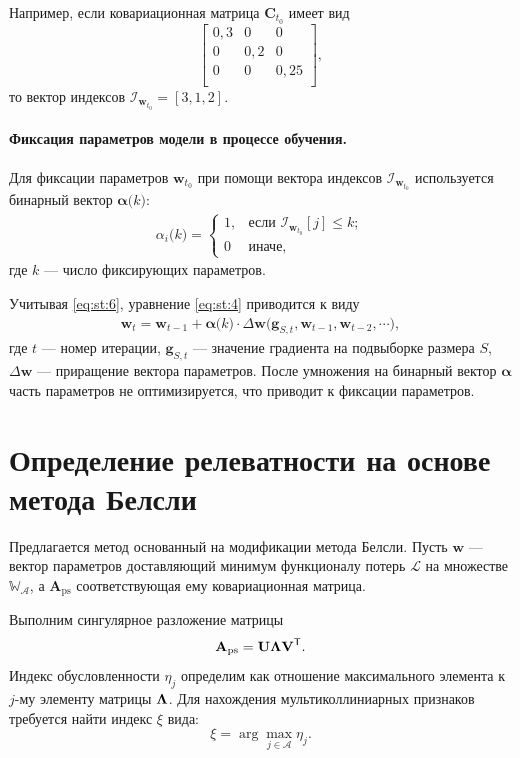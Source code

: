 Например, если ковариационная матрица $\textbf{C}_{t_0}$  имеет вид
 $$
\begin{bmatrix}
0{,}3& 0 & 0\\
0& 0{,}2 & 0\\
0& 0 & 0{,}25\\
\end{bmatrix},
 $$
 то вектор индексов $\mathcal{I}_{\textbf{w}_{t_0}} = [3,1,2]$.
 
\paragraph{Фиксация параметров модели в процессе обучения.}
Для фиксации параметров $\textbf{w}_{t_0}$ при помощи вектора индексов $\mathcal{I}_{\textbf{w}_{t_0}}$ используется бинарный вектор $\bm{\alpha}\bigr(k\bigr)$:
\[
\label{eq:st:6}
\begin{aligned}
\alpha_i\bigr(k\bigr) = \begin{cases}
   1, &\text{если }\mathcal{I}_{\textbf{w}_{t_0}}[j] \leq k;\\
   0 &\text{иначе},
 \end{cases}
\end{aligned}
\]
 где $k$ --- число фиксирующих параметров.
 
 Учитывая \eqref{eq:st:6}, уравнение \eqref{eq:st:4} приводится к виду
 \[
\label{eq:st:7}
\begin{aligned}
\textbf{w}_{t} = \textbf{w}_{t-1} + \bm{\alpha}\bigr(k\bigr)\cdot\Delta\textbf{w}\bigr(\textbf{g}_{S,t}, \textbf{w}_{t-1}, \textbf{w}_{t-2}, \cdots\bigr),
\end{aligned}
\]
где $t$ --- номер итерации, $\textbf{g}_{S,t}$ --- значение градиента на подвыборке размера $S$, $\Delta\textbf{w}$ --- приращение вектора параметров. После умножения на бинарный вектор $\bm\alpha$ часть параметров не оптимизируется, что приводит к фиксации параметров.

\section{Определение релеватности на основе метода Белсли}
Предлагается метод основанный на модификации метода Белсли. Пусть $\textbf{w}$ --- вектор параметров доставляющий минимум функционалу потерь $\mathcal{L}$ на  множестве $\mathbb{W_\mathcal{A}}$, а $\textbf{A}_\text{ps}$ соответствующая ему ковариационная матрица.

Выполним сингулярное разложение матрицы
\[
\label{4.1}
\textbf{A}_\text{ps} = \textbf{U}{\bf\Lambda}\textbf{V}^\mathsf{T}.
\]
Индекс обусловленности $\eta_{j}$ определим как отношение максимального элемента к $j$-му элементу матрицы ${\bf\Lambda}$. Для нахождения мультиколлиниарных признаков требуется найти индекс $\xi$ вида:
\[
\label{4.2}
\xi = \arg\max_{j\in \mathcal{A}}{\eta_j}.
\]

